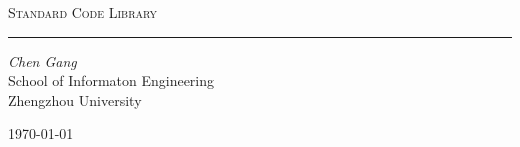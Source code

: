 \documentclass[7pt, a4paper, fleqn]{article}
\begin{document}
	\begin{titlepage}
	\begin{center} 
		\vspace*{120pt}  \textsc{\LARGE Standard Code Library}
		\vspace{20pt}
		\rule{13cm}{0.05em}
		\vspace{50pt}
		\begin{flushright}
			\emph{Chen Gang}\\
			School of Informaton Engineering\\
			Zhengzhou University\\
		\end{flushright}
		\vfill
		{\large \today}
	\end{center}
	\end{titlepage}
	\tableofcontents
	\clearpage
	
	
	\clearpage

	
	\clearpage

	
	\clearpage

	
	\clearpage

	
	\clearpage

	
	\clearpage

	
	\clearpage

	
	\clearpage
\end{document}
